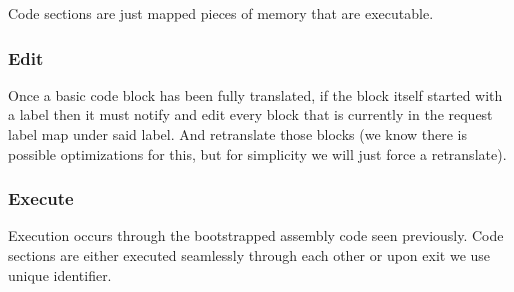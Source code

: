 Code sections are just mapped pieces of memory that are executable.

\subsubsection{Edit} Once a basic code block has been fully translated, if the
block itself started with a label then it must notify and edit every block that
is currently in the request label map under said label. And retranslate those
blocks (we know there is possible optimizations for this, but for simplicity we
will just force a retranslate).

\subsubsection{Execute} Execution occurs through the bootstrapped assembly code
seen previously. Code sections are either executed seamlessly through each
other or upon exit we use unique identifier.




